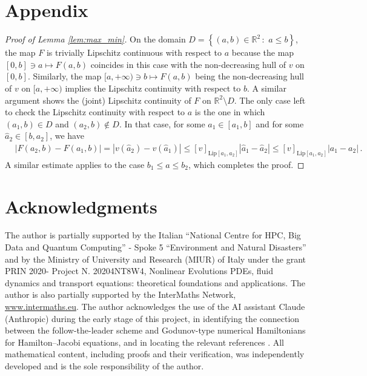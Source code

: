 \documentclass[reqno,oneside]{amsart}
\theoremstyle{plain}
\newcommand{\R}{\mathbb{R}}
\begin{document}
\section*{Appendix}\label{sec:app}

\begin{proof}[Proof of Lemma \ref{lem:max_min}]
On the domain $D=\left\{(a,b)\in \R^2\,:\,\, a\leq b\right\}$, the map $F$ is trivially Lipschitz continuous with respect to $a$ because the map $[0,b]\ni a \mapsto F(a,b)$ coincides in this case with the non-decreasing hull of $v$ on $[0,b]$. Similarly, the map $[a,+\infty)\ni b \mapsto F(a,b)$ being the non-decreasing hull of $v$ on $[a,+\infty)$ implies the Lipschitz continuity with respect to $b$. A similar argument shows the (joint) Lipschitz continuity of $F$ on $\R^2\setminus D$. The only case left to check the Lipschitz continuity with respect to $a$ is the one in which $(a_1,b)\in D$ and $(a_2,b)\not\in D$. In that case, for some $\hat{a}_1\in [a_1,b]$ and for some $\hat{a}_2\in [b,a_2]$, we have
\begin{align*}
    & |F(a_2,b)-F(a_1,b)|=|v(\hat{a}_2)-v(\hat{a}_1)|\leq [v]_{\mathrm{Lip}[a_1,a_2]}|\hat{a}_1-\hat{a}_2|\leq [v]_{\mathrm{Lip}[a_1,a_2]}|a_1-a_2|\,.
\end{align*}
A similar estimate applies to the case $b_1\leq a\leq b_2$, which completes the proof.
\end{proof}

\section*{Acknowledgments}
The author is partially supported by the Italian \enquote{National Centre for HPC, Big Data and Quantum Computing} - Spoke 5 \enquote{Environment and Natural Disasters} and by the Ministry of University and Research (MIUR) of Italy under the grant PRIN 2020- Project N. 20204NT8W4, Nonlinear Evolutions PDEs, fluid
dynamics and transport equations: theoretical foundations and applications. 
The author is also partially supported by the InterMaths Network, \url{www.intermaths.eu}.
The author acknowledges the use of the AI assistant Claude (Anthropic) during the early stage of this project, in identifying the connection between the follow-the-leader scheme and Godunov-type numerical Hamiltonians for Hamilton–Jacobi equations, and in locating the relevant references \cite{bardi_osher,crandall_lions,leveque}. All mathematical content, including proofs and their verification, was independently developed and is the sole responsibility of the author.
\end{document}
